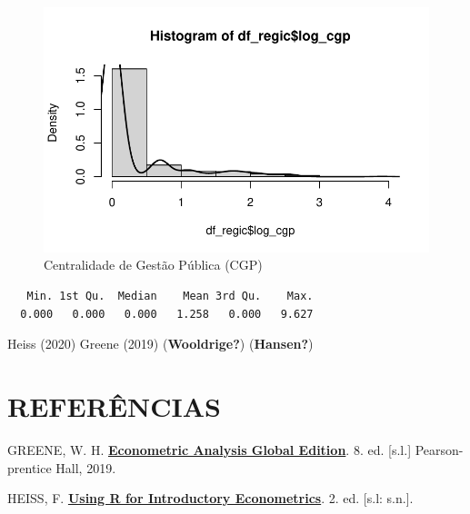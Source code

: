 \documentclass[a4paper,12pt]{article}
\newenvironment{Shaded}{}{}
\newcommand{\FunctionTok}[1]{\textcolor[rgb]{0.25,0.47,0.95}{#1}}
\newcommand{\NormalTok}[1]{\textcolor[rgb]{0.22,0.23,0.26}{#1}}
\newcommand{\SpecialCharTok}[1]{\textcolor[rgb]{0.00,0.52,0.74}{#1}}
\newlength{\cslhangindent}
\newlength{\cslentryspacingunit} %
\newenvironment{CSLReferences}[2] %
 {%
  \setlength{\parindent}{0pt}
  \ifodd #1
  \let\oldpar\par
  \def\par{\hangindent=\cslhangindent\oldpar}
  \fi
  \setlength{\parskip}{#2\cslentryspacingunit}
 }%
 {}
\begin{document}
\begin{figure}[H]

\caption{Centralidade de Gestão Pública (CGP)}

{\centering \includegraphics{main_files/figure-pdf/unnamed-chunk-7-1.pdf}

}

\end{figure}

\begin{Shaded}
\end{Shaded}

\begin{verbatim}
   Min. 1st Qu.  Median    Mean 3rd Qu.    Max. 
  0.000   0.000   0.000   1.258   0.000   9.627 
\end{verbatim}

Heiss (2020) Greene (2019) (\textbf{Wooldrige?}) (\textbf{Hansen?})
\newpage

\hypertarget{referuxeancias}{%
\section{REFERÊNCIAS}\label{referuxeancias}}

\singlespacing

\hypertarget{refs}{}
\begin{CSLReferences}{0}{1}
\leavevmode{}%
GREENE, W. H.
\textbf{\href{http://gen.lib.rus.ec/book/index.php?md5=2BB86D2F4CF47DB0A519E94D262C3331}{Econometric
Analysis Global Edition}}. 8. ed. {[}s.l.{]} Pearson-prentice Hall,
2019.

\leavevmode{}%
HEISS, F.
\textbf{\href{http://gen.lib.rus.ec/book/index.php?md5=5C3417608D22D155EA90339688548999}{Using
R for Introductory Econometrics}}. 2. ed. {[}s.l: s.n.{]}.

\end{CSLReferences}
\end{document}
